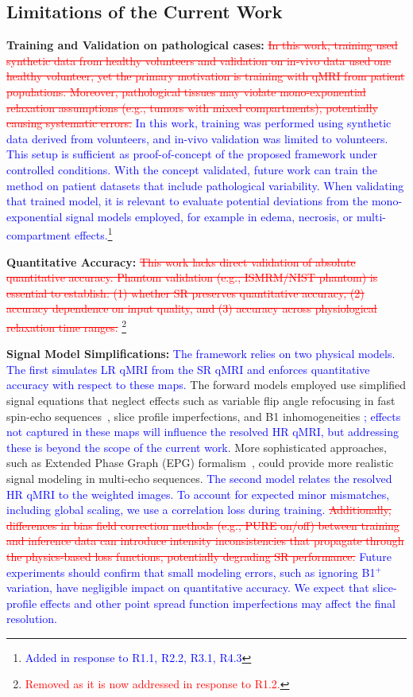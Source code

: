 \documentclass[journal,twoside,web]{ieeecolor}
\newcommand{\added}[1]{\textcolor{blue}{#1}}      %
\newcommand{\deleted}[1]{\textcolor{red}{\st{#1}}} %
\begin{document}
\subsection{Limitations of the Current Work}

\textbf{Training and Validation on pathological cases:} \deleted{In this work, training used synthetic data from healthy volunteers and validation on in-vivo data used one healthy volunteer, yet the primary motivation is training with qMRI from patient populations. Moreover, pathological tissues may violate mono-exponential relaxation assumptions (e.g., tumors with mixed compartments), potentially causing systematic errors.}
\added{In this work, training was performed using synthetic data derived 
from volunteers, and in-vivo validation was limited to volunteers. This 
setup is sufficient as proof-of-concept of the proposed framework under 
controlled conditions. With the concept validated, future work can train 
the method on patient datasets that include pathological variability. 
When validating that trained model, it is relevant to evaluate potential 
deviations from the mono-exponential signal models employed, for 
example in edema, necrosis, or multi-compartment effects.}\footnote{\textcolor{blue}{Added in response to R1.1, R2.2, R3.1, R4.3}}


\textbf{Quantitative Accuracy:} \deleted{This work lacks direct validation of absolute quantitative accuracy. Phantom validation (e.g., ISMRM/NIST phantom) is essential to establish: (1) whether SR preserves quantitative accuracy, (2) accuracy dependence on input quality, and (3) accuracy across physiological relaxation time ranges.} \footnote{\textcolor{red}{Removed as it is now addressed in response to R1.2.}}


\textbf{Signal Model Simplifications:} \added{The framework relies on two physical models. The first simulates LR qMRI from the SR qMRI and enforces quantitative accuracy with respect to these maps.} The forward models employed use simplified signal equations that neglect effects such as variable flip angle refocusing in fast spin-echo sequences~\cite{b29}, slice profile imperfections, and B1 inhomogeneities \added{; effects not captured in these maps will influence the resolved HR qMRI, but addressing these is beyond the scope of the current work}. More sophisticated approaches, such as Extended Phase Graph (EPG) formalism~\cite{b30}, could provide more realistic signal modeling in multi-echo sequences. \added{The second model relates the resolved HR qMRI to the weighted images. To account for expected minor mismatches, including global scaling, we use a correlation loss during training.} \deleted{Additionally, differences in bias field correction methods (e.g., PURE%
on/off) between training and inference data can introduce intensity inconsistencies that propagate through the physics-based loss functions, potentially degrading SR performance.} \added{Future experiments should confirm that small modeling errors, such as ignoring B1$^+$ variation, have negligible impact on quantitative accuracy. We expect that slice-profile effects and other point spread function imperfections may affect the final resolution.}
\end{document}
